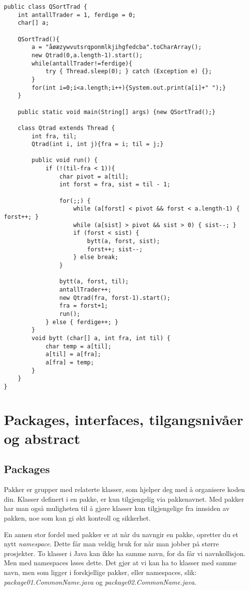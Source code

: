 \documentclass[a4paper,norsk,10pt]{article}
\begin{document}
\begin{verbatim}
public class QSortTrad {
    int antallTrader = 1, ferdige = 0;
    char[] a;

    QSortTrad(){
        a = "åøæzywvutsrqponmlkjihgfedcba".toCharArray();
        new Qtrad(0,a.length-1).start();
        while(antallTrader!=ferdige){
            try { Thread.sleep(0); } catch (Exception e) {};
        }
        for(int i=0;i<a.length;i++){System.out.print(a[i]+" ");}
    }
    
    public static void main(String[] args) {new QSortTrad();}

    class Qtrad extends Thread {
        int fra, til;
        Qtrad(int i, int j){fra = i; til = j;}

        public void run() {
            if (!(til-fra < 1)){
                char pivot = a[til];
                int forst = fra, sist = til - 1;

                for(;;) {
                    while (a[forst] < pivot && forst < a.length-1) { forst++; }
                    while (a[sist] > pivot && sist > 0) { sist--; }
                    if (forst < sist) { 
                        bytt(a, forst, sist);
                        forst++; sist--;
                    } else break;
                }
        
                bytt(a, forst, til);
                antallTrader++;
                new Qtrad(fra, forst-1).start();
                fra = forst+1;
                run();
            } else { ferdige++; }
        }
        void bytt (char[] a, int fra, int til) {
            char temp = a[til];
            a[til] = a[fra];
            a[fra] = temp;
        }
    }
}
\end{verbatim}
\section{Packages, interfaces, tilgangsnivåer og abstract}
\label{sec-16}
\subsection{Packages}
\label{sec-16.1}

Pakker er grupper med relaterte klasser, som hjelper deg med å 
organisere koden din. Klasser definert i en pakke, er kun tilgjengelig
via pakkenavnet. Med pakker har man også muligheten til å gjøre
klasser kun tilgjengelige fra innsiden av pakken, noe som kan gi økt
kontroll og sikkerhet. 

En annen stor fordel med pakker er at når du navngir en pakke,
opretter du et nytt \emph{namespace}. Dette får man veldig bruk for når man
jobber på større prosjekter. To klasser i Java kan ikke ha samme navn,
for da får vi navnkollisjon. Men med namespaces løses dette. Det gjør
at vi kan ha to klasser med samme navn, men som ligger i forskjellige
pakker, eller namespaces, slik: \emph{package01.CommonName.java} og
\emph{package02.CommonName.java}. 
\end{document}
